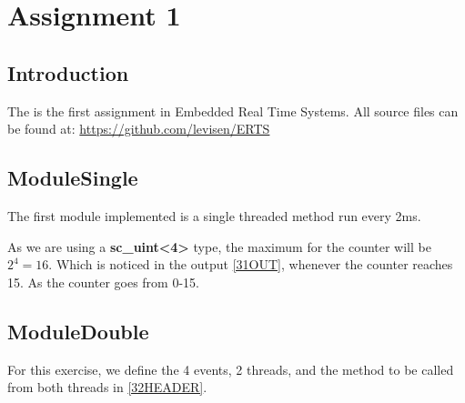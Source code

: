 \documentclass[a4paper,12pt]{report}    %
\begin{document}
\lstset{style=output}

\tableofcontents
\pagestyle{ProjectReport}
\newpage
\lstlistoflistings
\newpage

\chapter{Assignment 1}
\section{Introduction}

The is the first assignment in Embedded Real Time Systems.
All source files can be found at: \url{https://github.com/levisen/ERTS}






\section{ModuleSingle}

The first module implemented is a single threaded method run every 2ms. 

\lstset{style=code}




As we are using a \textbf{sc\_uint<4>} type, the maximum for the counter will be \( 2^4 = 16 \). Which is noticed in the output \ref{31OUT}, whenever the counter reaches 15. As the counter goes from 0-15.

\lstset{style=output}







\section{ModuleDouble}

For this exercise, we define the 4 events, 2 threads, and the method to be called from both threads in \ref{32HEADER}.

\lstset{style=code}

\end{document}

